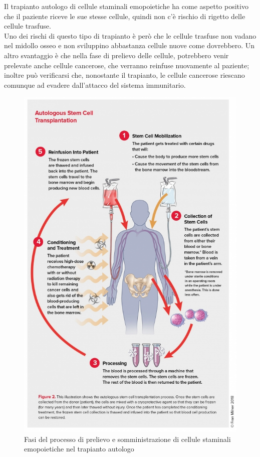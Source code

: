 Il trapianto autologo di cellule staminali emopoietiche ha come aspetto positivo che il paziente riceve le sue 
stesse cellule, quindi non c’è rischio di rigetto delle cellule trasfuse.\\ 
Uno dei rischi di questo tipo di trapianto è però che le cellule trasfuse non vadano nel midollo osseo e non 
sviluppino abbastanza cellule nuove come dovrebbero. Un altro svantaggio è che nella fase di prelievo delle cellule, 
potrebbero venir prelevate anche cellule cancerose, che verranno reinfuse nuovamente al paziente; inoltre può 
verificarsi che, nonostante il trapianto, le cellule cancerose riescano comunque ad evadere dall’attacco 
del sistema immunitario\cite{STEMCELLS}.

\begin{figure}[H]
    \begin{center}
    \includegraphics[width=0.7\columnwidth]{img/AUTOLOGO.jpeg}
    \vspace{-3mm}
    \end{center}
    \caption{Fasi del processo di prelievo e somministrazione di cellule staminali emopoietiche nel trapianto autologo
    \cite{LLSBLOOD}}
    \label{fig:FIGURE_3.15}
\end{figure}

